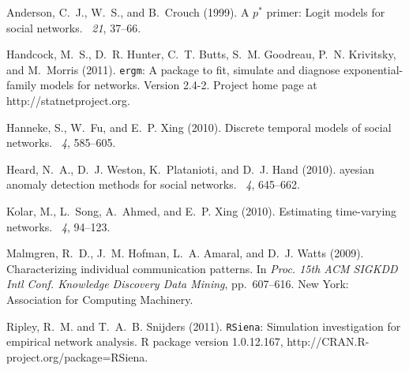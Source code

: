 \documentclass[final]{statsoc}
\begin{document}
\begin{thebibliography}{}

Anderson, C.~J., W.~S., and B.~Crouch (1999).
\newblock A $p^{\ast}$ primer: Logit models for social networks.
~{\em 21}, 37--66.

\vspace{-0.6\baselineskip}
Handcock, M.~S., D.~R. Hunter, C.~T. Butts, S.~M. Goodreau, P.~N. Krivitsky,
  and M.~Morris (2011).
\newblock \texttt{ergm}: A package to fit, simulate and diagnose
  exponential-family models for networks.
\newblock Version 2.4-2. Project home page at http://statnetproject.org.

\vspace{-0.6\baselineskip}
Hanneke, S., W.~Fu, and E.~P. Xing (2010).
\newblock Discrete temporal models of social networks.
~{\em 4}, 585--605.

\vspace{-0.6\baselineskip}
Heard, N.~A., D.~J. Weston, K.~Platanioti, and D.~J. Hand (2010).
ayesian anomaly detection methods for social networks.
~{\em 4}, 645--662.

\vspace{-0.6\baselineskip}
Kolar, M., L.~Song, A.~Ahmed, and E.~P. Xing (2010).
\newblock Estimating time-varying networks.
~{\em 4}, 94--123.

\vspace{-0.6\baselineskip}
Malmgren, R.~D., J.~M. Hofman, L.~A. Amaral, and D.~J. Watts (2009).
\newblock Characterizing individual communication patterns.
\newblock In {\em Proc. 15th ACM SIGKDD Intl Conf. Knowledge Discovery Data
  Mining}, pp.\  607--616. New York: Association for Computing Machinery.

\vspace{-0.6\baselineskip}
Ripley, R.~M. and T.~A.~B. Snijders (2011).
\newblock \texttt{RSiena}: Simulation investigation for empirical network
  analysis.
\newblock R package version 1.0.12.167,
  http://CRAN.R-project.org/package=RSiena.


\end{thebibliography}
\end{document}
